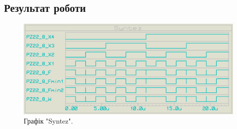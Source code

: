 \documentclass{article}
\begin{document}
\begin{normalsize}
	\section*{Результат роботи}
	\begin{landscape}
		\thispagestyle{empty}
		\begin{figure}[p]
			\vspace*{-2cm}
		\end{figure}
	\end{landscape}

	\begin{figure}[H]
		\centering
		\includegraphics[scale=0.3]{g}
		\caption{Графік "Syntez".}
	\end{figure}
	    
\end{normalsize}
\end{document}

